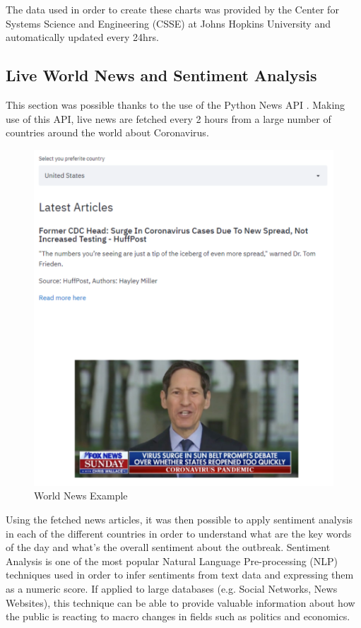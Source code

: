 The data used in order to create these charts was provided by the Center for Systems Science and Engineering (CSSE) at Johns Hopkins University \cite{world_data} and automatically updated every 24hrs.

\subsection{Live World News and Sentiment Analysis}

This section was possible thanks to the use of the Python News API \cite{news}. Making use of this API, live news are fetched every 2 hours from a large number of countries around the world about Coronavirus. 

\begin{figure}[ht!]%
    \centering
    \includegraphics[width=0.8\linewidth]{latex/images/news.pdf}
    \caption{World News Example}
    \label{news}
\end{figure}

Using the fetched news articles, it was then possible to apply sentiment analysis in each of the different countries in order to understand what are the key words of the day and what's the overall sentiment about the outbreak. Sentiment Analysis is one of the most popular Natural Language Pre-processing (NLP) techniques used in order to infer sentiments from text data and expressing them as a numeric score. If applied to large databases (e.g. Social Networks, News Websites), this technique can be able to provide valuable information about how the public is reacting to macro changes in fields such as politics and economics.

